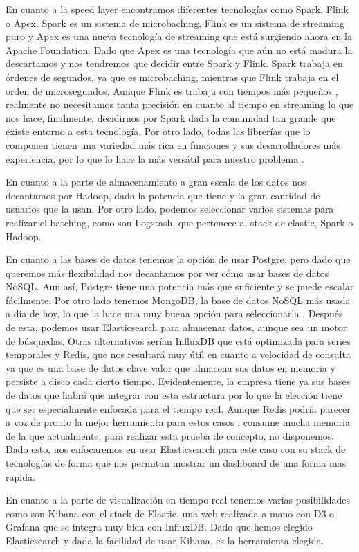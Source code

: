 En cuanto a la speed layer encontramos diferentes tecnologías como Spark, Flink o Apex. Spark es un sistema de microbaching, Flink es un sistema de streaming puro y Apex es una nueva tecnología de streaming que está surgiendo ahora en la Apache Foundation. Dado que Apex es una tecnología que aún no está madura la descartamos y nos tendremos que decidir entre Spark y Flink. Spark trabaja en órdenes de segundos, ya que es microbaching, mientras que Flink trabaja en el orden de microsegundos. Aunque Flink es trabaja con tiempos más pequeños \cite{Hrr-4}, realmente no necesitamos tanta precisión en cuanto al tiempo en streaming lo que nos hace, finalmente, decidirnos por Spark dada la comunidad tan grande que existe entorno a esta tecnología. Por otro lado, todas las librerías que lo componen tienen una variedad más rica en funciones y sus desarrolladores más experiencia, por lo que lo hace la más versátil para nuestro problema \cite{Hrr-3}.\par

En cuanto a la parte de almacenamiento a gran escala de los datos nos decantamos por Hadoop, dada la potencia que tiene y la gran cantidad de usuarios que la usan. Por otro lado, podemos seleccionar varios sistemas para realizar el batching, como son Logstash, que pertenece al stack de elastic, Spark o Hadoop.\par

En cuanto a las bases de datos tenemos la opción de usar Postgre, pero dado que queremos más flexibilidad nos decantamos por ver cómo usar bases de datos NoSQL. Aun así, Postgre tiene una potencia más que suficiente y se puede escalar fácilmente. Por otro lado tenemos MongoDB, la base de datos NoSQL más usada a dia de hoy, lo que la hace una muy buena opción para seleccionarla \cite{Hrr-5}. Después de esta, podemos usar Elasticsearch para almacenar datos, aunque sea un motor de búsquedas. Otras alternativas serían InfluxDB que está optimizada para series temporales y Redis, que nos resultará muy útil en cuanto a velocidad de consulta ya que es una base de datos clave valor que almacena sus datos en memoria y persiste a disco cada cierto tiempo. Evidentemente, la empresa tiene ya sus bases de datos que habrá que integrar con esta estructura por lo que la elección tiene que ser especialmente enfocada para el tiempo real. Aunque Redis podría parecer a voz de pronto la mejor herramienta para estos casos \cite{Hrr-6}, consume mucha memoria de la que actualmente, para realizar esta prueba de concepto, no disponemos. Dado esto, nos enfocaremos en usar Elasticsearch para este caso con su stack de tecnologías de forma que nos permitan mostrar un dashboard de una forma mas rapida.\par

En cuanto a la parte de visualización en tiempo real tenemos varias posibilidades como son Kibana con el stack de Elastic, una web realizada a mano con D3 o Grafana que se integra muy bien con InfluxDB. Dado que hemos elegido Elasticsearch y dada la facilidad de usar Kibana, es la herramienta elegida.\par
